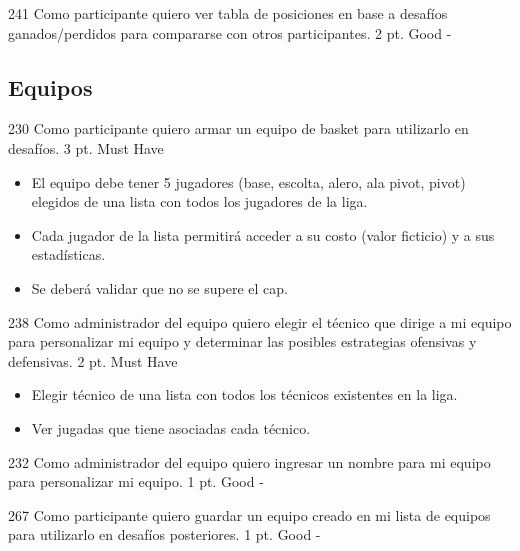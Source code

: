 \vspace{1cm}

\simplestory
{241}
{Como participante quiero ver tabla de posiciones en base a desafíos ganados/perdidos para compararse con otros participantes.}
{2 pt.}
{Good}
{-}

\vspace{1cm}



\subsection{Equipos}

\simplestory
{230}
{Como participante quiero armar un equipo de basket para utilizarlo en desafíos.}
{3 pt.}
{Must Have}
{\begin{itemize}
\item El equipo debe tener 5 jugadores (base, escolta, alero, ala pivot, pivot) elegidos de una lista con todos los jugadores de la liga.
\item Cada jugador de la lista permitirá acceder a su costo (valor ficticio) y a sus estadísticas.
\item Se deberá validar que no se supere el cap.
\end{itemize}}

\vspace{1cm}

\simplestory
{238}
{Como administrador del equipo quiero elegir el técnico que dirige a mi equipo para personalizar mi equipo y determinar las posibles estrategias ofensivas y defensivas.}
{2 pt.}
{Must Have}
{\begin{itemize}
\item Elegir técnico de una lista con todos los técnicos existentes en la liga.
\item Ver jugadas que tiene asociadas cada técnico.
\end{itemize}}

\vspace{1cm}

\simplestory
{232}
{Como administrador del equipo quiero ingresar un nombre para mi equipo para personalizar mi equipo.}
{1 pt.}
{Good}
{-}

\vspace{1cm}

\simplestory
{267}
{Como participante quiero guardar un equipo creado en mi lista de equipos para utilizarlo en desafíos posteriores.}
{1 pt.}
{Good}
{-}

